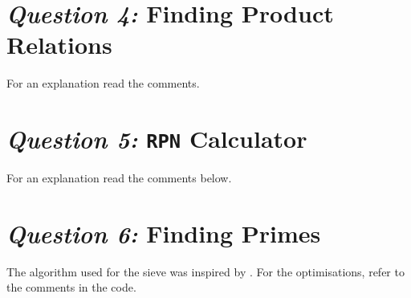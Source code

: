 \documentclass[12pt]{article}
\begin{document}






\section{\textit{Question 4:} Finding Product Relations}

For an explanation read the comments.







\section{\textit{Question 5:} \texttt{RPN} Calculator}

For an explanation read the comments below.







\section{\textit{Question 6:} Finding Primes}

The algorithm used for the sieve was inspired by
\textcite{sorenson90}. For the optimisations, refer to the
comments in the code.






\end{document}
